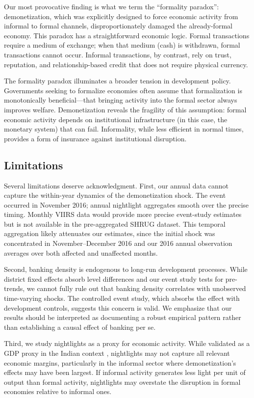 \documentclass[12pt]{article}
\begin{document}
Our most provocative finding is what we term the ``formality paradox'': demonetization, which was explicitly designed to force economic activity from informal to formal channels, disproportionately damaged the already-formal economy. This paradox has a straightforward economic logic. Formal transactions require a medium of exchange; when that medium (cash) is withdrawn, formal transactions cannot occur. Informal transactions, by contrast, rely on trust, reputation, and relationship-based credit that does not require physical currency.

The formality paradox illuminates a broader tension in development policy. Governments seeking to formalize economies often assume that formalization is monotonically beneficial---that bringing activity into the formal sector always improves welfare. Demonetization reveals the fragility of this assumption: formal economic activity depends on institutional infrastructure (in this case, the monetary system) that can fail. Informality, while less efficient in normal times, provides a form of insurance against institutional disruption.

\subsection{Limitations}

Several limitations deserve acknowledgment. First, our annual data cannot capture the within-year dynamics of the demonetization shock. The event occurred in November 2016; annual nightlight aggregates smooth over the precise timing. Monthly VIIRS data would provide more precise event-study estimates but is not available in the pre-aggregated SHRUG dataset. This temporal aggregation likely attenuates our estimates, since the initial shock was concentrated in November--December 2016 and our 2016 annual observation averages over both affected and unaffected months.

Second, banking density is endogenous to long-run development processes. While district fixed effects absorb level differences and our event study tests for pre-trends, we cannot fully rule out that banking density correlates with unobserved time-varying shocks. The controlled event study, which absorbs the effect with development controls, suggests this concern is valid. We emphasize that our results should be interpreted as documenting a robust empirical pattern rather than establishing a causal effect of banking per se.

Third, we study nightlights as a proxy for economic activity. While validated as a GDP proxy in the Indian context \citep{chodorow2020cash}, nightlights may not capture all relevant economic margins, particularly in the informal sector where demonetization's effects may have been largest. If informal activity generates less light per unit of output than formal activity, nightlights may overstate the disruption in formal economies relative to informal ones.
\end{document}

